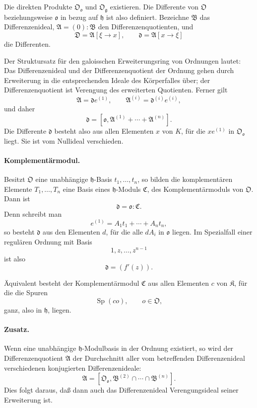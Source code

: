 \documentclass[11pt]{article}
\begin{document}
Die direkten Produkte $\mathfrak O_{\mathfrak o}$ und $\mathfrak O_{\mathfrak g}$ existieren. Die Differente von $\mathfrak O$ beziehungsweise $\mathfrak o$ in bezug auf $\mathfrak h$ ist also definiert. Bezeichne $\mathfrak B$ das Differenzenideal, $\mathfrak A=(0):\mathfrak B$ den Differenzenquotienten, und
\[
        \mathfrak D=\mathfrak A[\xi\to x],
        \qquad
        \mathfrak d=\mathfrak A[x\to\xi]
\]
die Differenten.

Der Struktursatz für den galoisschen Erweiterungsring von Ordnungen lautet: Das Differenzenideal und der Differenzenquotient der Ordnung gehen durch Erweiterung in die entsprechenden Ideale des Körperfalles über; der Differenzenquotient ist Verengung des erweiterten Quotienten. Ferner gilt
\[
        \mathfrak A=\mathfrak d e^{(1)},
        \qquad
        \mathfrak A^{(i)}=\mathfrak d^{(i)}e^{(i)},
\]
und daher
\[
        \mathfrak d=[\mathfrak o,\mathfrak A^{(1)}+
        \cdots+\mathfrak A^{(n)}].
\]
Die Differente $\mathfrak d$ besteht also aus allen Elementen $x$ von $K$, für die $xe^{(1)}$ in $\mathfrak O_{\mathfrak o}$ liegt. Sie ist vom Nullideal verschieden.

\paragraph{Komplementärmodul.}
Besitzt $\mathfrak O$ eine unabhängige $\mathfrak h$-Basis $t_1,\ldots,t_n$, so bilden die komplementären Elemente $T_1,\ldots,T_n$ eine Basis eines $\mathfrak h$-Moduls $\mathfrak C$, des Komplementärmoduls von $\mathfrak O$. Dann ist
\[
        \mathfrak d=\mathfrak o:\mathfrak C.
\]
Denn schreibt man
\[
        e^{(1)}=A_1t_1+
        \cdots+A_nt_n,
\]
so besteht $\mathfrak d$ aus den Elementen $d$, für die alle $dA_i$ in $\mathfrak o$ liegen. Im Spezialfall einer regulären Ordnung mit Basis
\[
        1,z,\ldots,z^{n-1}
\]
ist also
\[
        \mathfrak d=(f'(z)).
\]

Äquivalent besteht der Komplementärmodul $\mathfrak C$ aus allen Elementen $c$ von $\mathfrak K$, für die die Spuren
\[
        \operatorname{Sp}(co),\qquad o\in\mathfrak O,
\]
ganz, also in $\mathfrak h$, liegen.

\paragraph{Zusatz.}
Wenn eine unabhängige $\mathfrak h$-Modulbasis in der Ordnung existiert, so wird der Differenzenquotient $\mathfrak A$ der Durchschnitt aller vom betreffenden Differenzenideal verschiedenen konjugierten Differenzenideale:
\[
        \mathfrak A=[\mathfrak O_{\mathfrak o},
        \mathfrak B^{(2)}\cap\cdots\cap\mathfrak B^{(n)}].
\]
Dies folgt daraus, daß dann auch das Differenzenideal Verengungsideal seiner Erweiterung ist.
\end{document}
